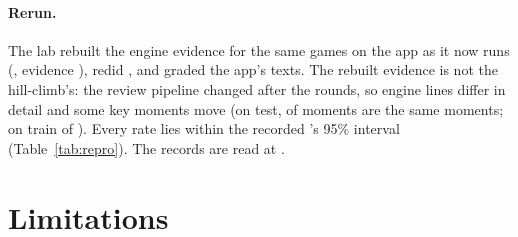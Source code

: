 \documentclass[11pt]{article}
\begin{document}
\paragraph{Rerun.} The lab rebuilt the engine evidence for the same games on the app as it now runs
(\AppCommit, evidence \RerunEvidence), redid \RerunSearches, and
graded the app's texts. \AppKeptSentence{} \RerunTextsSentence{} The rebuilt evidence is not the hill-climb's: the review pipeline changed
after the rounds, so engine lines differ in detail and some key moments move (on test,
\RerunTestShared{} of \RerunTestMoments{} moments are the same moments; on train
\RerunTrainShared{} of \RerunTrainMoments). Every rate lies within the recorded \KeptVariant's 95\%
interval (Table~\ref{tab:repro}). The records
are read at \RecordsCommit.

\begin{table}[!htbp]
\centering\footnotesize
\ReproTable
\caption{The recorded baseline and kept variant beside the pinned app's texts on rebuilt evidence.}
\label{tab:repro}
\end{table}

\section{Limitations}
\end{document}
